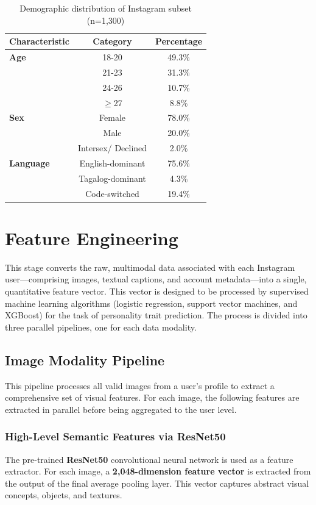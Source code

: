 \begin{table}[h]
	\centering
	\caption{Demographic distribution of Instagram subset (n=1,300)}
	\label{tab:demo}
	\begin{tabular}{lcc}
		\hline
		\textbf{Characteristic} & \textbf{Category} & \textbf{Percentage} \\ \hline
		\textbf{Age} & 18-20 & 49.3\% \\
		& 21-23 & 31.3\% \\
		& 24-26 & 10.7\% \\
		& $\geq$27 & 8.8\% \\ \hline
		\textbf{Sex} & Female & 78.0\% \\
		& Male & 20.0\% \\
		& Intersex/ Declined & 2.0\% \\ \hline
		\textbf{Language} & English-dominant & 75.6\% \\
		& Tagalog-dominant & 4.3\% \\
		& Code-switched & 19.4\% \\ \hline
	\end{tabular}
\end{table}



\section{Feature Engineering}
\label{subsec:features}
This stage converts the raw, multimodal data associated with each Instagram user—comprising images, textual captions, and account metadata—into a single, quantitative feature vector. This vector is designed to be processed by supervised machine learning algorithms (logistic regression, support vector machines, and XGBoost) for the task of personality trait prediction. The process is divided into three parallel pipelines, one for each data modality.

\subsection{Image Modality Pipeline}
This pipeline processes all valid images from a user's profile to extract a comprehensive set of visual features. For each image, the following features are extracted in parallel before being aggregated to the user level.

\subsubsection{High-Level Semantic Features via ResNet50}
The pre-trained \textbf{ResNet50} convolutional neural network is used as a feature extractor. For each image, a \textbf{2,048-dimension feature vector} is extracted from the output of the final average pooling layer. This vector captures abstract visual concepts, objects, and textures.

